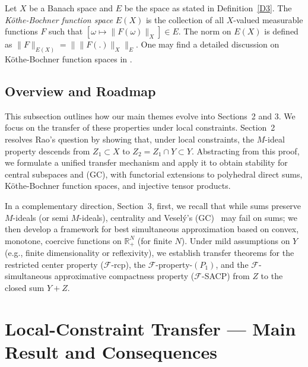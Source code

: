 \documentclass[11pt]{amsart}
\newcommand{\mb}{\mathbb}
\newcommand{\mr}{\mathscr}
\newcommand{\om}{\omega}
\newcommand{\GC}{{\mbox{\rm (GC)}}}
\begin{document}
Let $X$ be a Banach space and $E$ be the space as stated in Definition~\ref{D3}. The {\it K\"othe-Bochner function space} $E(X)$ is the collection of all $X$-valued measurable functions $F$ such that $[\om\mapsto \|F(\om)\|_X]\in E$. The norm on $E(X)$ is defined as $\|F\|_{E(X)}=\big\|\|F(.)\|_X\big\|_E$.
One may find a detailed discussion on K\"othe-Bochner function spaces in \cite{PKL}.

\subsection{Overview and Roadmap}

This subsection outlines how our main themes evolve into Sections~2 and 3.
We focus on the transfer of these properties under local constraints. 
Section~2 resolves Rao’s question by showing that, under local constraints, the $M$-ideal property descends from $Z_1\subset X$ to $Z_2=Z_1\cap Y\subset Y$. 
Abstracting from this proof, we formulate a unified transfer mechanism and apply it to obtain stability for central subspaces and \GC, with functorial extensions to polyhedral direct sums, K\"othe-Bochner function spaces, and injective tensor products.

In a complementary direction, Section~3, first, we recall that while sums preserve $M$-ideals (or semi $M$-ideals), centrality and Vesel\'y’s \GC~ may fail on sums; we then develop a framework for best simultaneous approximation based on convex, monotone, coercive functions 
on $\mb{R}^N_+$ (for finite $N$).
Under mild assumptions on $Y$ (e.g., finite dimensionality or reflexivity),
we establish transfer theorems for the restricted center property ($\mr{F}$-rcp), the $\mr{F}$-property-$(P_1)$, and the $\mr{F}$-simultaneous approximative compactness property ($\mr{F}$-SACP) from $Z$ to the closed sum $Y+Z$.




\section{Local-Constraint Transfer --- Main Result and Consequences}
\end{document}
